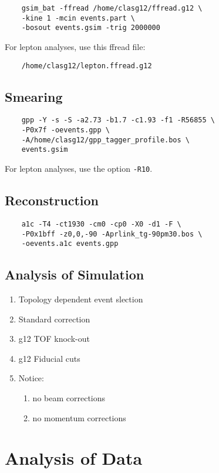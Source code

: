 \documentclass[10pt,twocolumn,oneside,letterpaper]{article}
\begin{document}
\begin{verbatim}
    gsim_bat -ffread /home/clasg12/ffread.g12 \
    -kine 1 -mcin events.part \
    -bosout events.gsim -trig 2000000
\end{verbatim}
For lepton analyses, use this ffread file:
\begin{verbatim}
    /home/clasg12/lepton.ffread.g12
\end{verbatim}

\subsection{Smearing}

\begin{verbatim}
    gpp -Y -s -S -a2.73 -b1.7 -c1.93 -f1 -R56855 \
    -P0x7f -oevents.gpp \
    -A/home/clasg12/gpp_tagger_profile.bos \
    events.gsim
\end{verbatim}
For lepton analyses, use the option \verb|-R10|.

\subsection{Reconstruction}

\begin{verbatim}
    a1c -T4 -ct1930 -cm0 -cp0 -X0 -d1 -F \
    -P0x1bff -z0,0,-90 -Aprlink_tg-90pm30.bos \
    -oevents.a1c events.gpp
\end{verbatim}

\subsection{Analysis of Simulation}

\begin{enumerate}
    \item Topology dependent event slection
    \item Standard  correction
    \item g12 TOF knock-out
    \item g12 Fiducial cuts
    \item Notice:
    \begin{enumerate}
        \item no beam corrections
        \item no momentum corrections
    \end{enumerate}
\end{enumerate}

\section{Analysis of Data}
\end{document}
